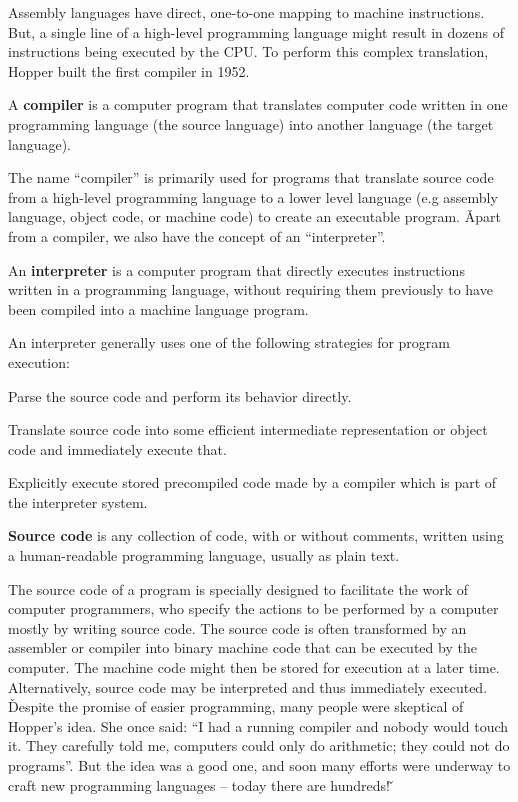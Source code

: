 Assembly languages have direct, one-to-one mapping to machine instructions. But, a single line of a high-level
programming language might result in dozens of instructions being executed by the CPU. To perform this complex
translation, Hopper built the first compiler in 1952.

\bd[Compiler]
A \textbf{compiler} is a computer program that translates computer code written in one programming language (the
source language) into another language (the target language).
\ed

The name ``compiler'' is primarily used for programs that translate source code from a high-level programming
language to a lower level language (e.g assembly language, object code, or machine code) to create an executable
program. \v

Apart from a compiler, we also have the concept of an ``interpreter''.

\bd[Interpreter]
An \textbf{interpreter} is a computer program that directly executes instructions written in a programming language,
without requiring them previously to have been compiled into a machine language program.
\ed

An interpreter generally uses one of the following strategies for program execution:
\bit
\item Parse the source code and perform its behavior directly.
\item Translate source code into some efficient intermediate representation or object code and immediately execute that.
\item Explicitly execute stored precompiled code made by a compiler which is part of the interpreter system.
\eit

\textbf{Source code} is any collection of code, with or without comments, written using a human-readable programming
language, usually as plain text.
\ed

The source code of a program is specially designed to facilitate the work of computer programmers, who specify the
actions to be performed by a computer mostly by writing source code. The source code is often transformed by an
assembler or compiler into binary machine code that can be executed by the computer. The machine code might then be
stored for execution at a later time. Alternatively, source code may be interpreted and thus immediately executed. \v

Despite the promise of easier programming, many people were skeptical of Hopper's idea. She once said: ``I had a
running compiler and nobody would touch it. They carefully told me, computers could only do arithmetic; they could
not do programs''. But the idea was a good one, and soon many efforts were underway to craft new programming
languages -- today there are hundreds! \v

